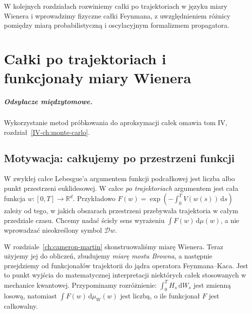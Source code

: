 \documentclass[11pt,a4paper,oneside]{report}
\numberwithin{equation}{chapter}
\theoremstyle{plain}
\theoremstyle{definition}
\theoremstyle{remark}
\newcommand{\R}{\mathbb{R}}
\newcommand{\dd}{\mathrm{d}}
\begin{document}
W kolejnych rozdziałach rozwiniemy całki po trajektoriach
w języku miary Wienera i wprowadzimy fizyczne całki
Feynmana, z uwzględnieniem różnicy pomiędzy miarą
probabilistyczną i oscylacyjnym formalizmem propagatora.




\chapter{Całki po trajektoriach i funkcjonały miary Wienera}
\label{ch:path-integrals}
\paragraph{Odsyłacze międzytomowe.} Wykorzystanie metod próbkowania do aproksymacji całek omawia tom IV, rozdział~\ref{IV-ch:monte-carlo}.


\section{Motywacja: całkujemy po przestrzeni funkcji}

W zwykłej całce Lebesgue'a argumentem funkcji podcałkowej jest liczba
albo punkt przestrzeni euklidesowej. W całce \emph{po trajektoriach}
argumentem jest cała funkcja $w:[0,T]\to\R^d$. Przykładowo
$F(w)=\exp(-\int_0^T V(w(s))\,\dd s)$ zależy od tego, w jakich
obszarach przestrzeni przebywała trajektoria w całym przedziale czasu.
Chcemy nadać ścisły sens wyrażeniu $\int F(w)\,\dd\mu(w)$, a nie
wprowadzać nieokreślony symbol $\mathcal D w$.

W rozdziale~\ref{ch:cameron-martin} skonstruowaliśmy miarę Wienera.
Teraz użyjemy jej do obliczeń, zbudujemy \emph{miarę mostu Browna},
a następnie przejdziemy od funkcjonałów trajektorii do jądra
operatora Feynmana--Kaca. Jest to punkt wyjścia do matematycznej
interpretacji niektórych całek stosowanych w mechanice kwantowej.
Przypominamy rozróżnienie: $\int_0^T H_s\,\dd W_s$ jest zmienną
losową, natomiast $\int F(w)\,\dd\mu_W(w)$ jest liczbą, o ile
funkcjonał $F$ jest całkowalny.
\end{document}
